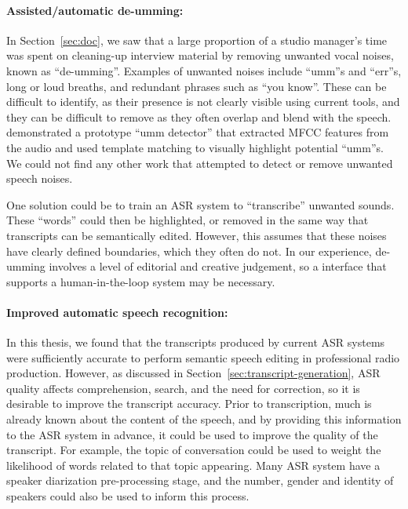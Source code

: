 \paragraph{Assisted/automatic de-umming:}

In Section~\ref{sec:doc}, we saw that a large proportion of a studio manager's time was spent on cleaning-up interview
material by removing unwanted vocal noises, known as ``de-umming''. Examples of unwanted noises include ``umm''s and
``err''s, long or loud breaths, and redundant phrases such as ``you know''.  These can be difficult to identify, as
their presence is not clearly visible using current tools, and they can be difficult to remove as they often overlap
and blend with the speech. \citet{Loviscach2013} demonstrated a prototype ``umm detector'' that extracted MFCC
\citep{Imai1983} features from the audio and used template matching to visually highlight potential ``umm''s. We could
not find any other work that attempted to detect or remove unwanted speech noises.

One solution could be to train an
ASR system to ``transcribe'' unwanted sounds. These ``words'' could then be highlighted, or removed in the same way
that transcripts can be semantically edited.  However, this assumes that these noises have clearly defined boundaries,
which they often do not.  In our experience, de-umming involves a level of editorial and creative judgement, so a
interface that supports a human-in-the-loop system may be necessary.

\paragraph{Improved automatic speech recognition:}

In this thesis, we found that the transcripts produced by current ASR systems were sufficiently accurate to perform
semantic speech editing in professional radio production. However, as discussed in
Section~\ref{sec:transcript-generation}, ASR quality affects comprehension, search, and the need for correction, so it
is desirable to improve the transcript accuracy. Prior to transcription, much is already known about the content of the
speech, and by providing this information to the ASR system in advance, it could be used to improve the quality of the
transcript.  For example, the topic of conversation could be used to weight the likelihood of words related to that
topic appearing.  Many ASR system have a speaker diarization pre-processing stage, and the number, gender and identity
of speakers could also be used to inform this process.

